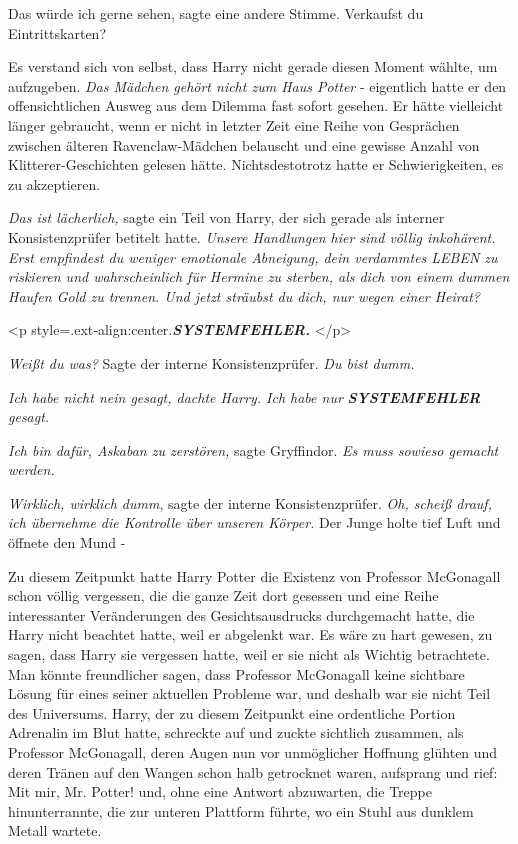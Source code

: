 \glqq Das würde ich gerne sehen\grqq{}, sagte eine andere Stimme. \glqq
Verkaufst du Eintrittskarten?\grqq{}

Es verstand sich von selbst, dass Harry nicht gerade diesen Moment wählte, um
aufzugeben. \emph{Das Mädchen gehört nicht zum Haus Potter }- eigentlich hatte
er den offensichtlichen Ausweg aus dem Dilemma fast sofort gesehen. Er hätte
vielleicht länger gebraucht, wenn er nicht in letzter Zeit eine Reihe von
Gesprächen zwischen älteren Ravenclaw-Mädchen belauscht und eine gewisse Anzahl
von Klitterer-Geschichten gelesen hätte. Nichtsdestotrotz hatte er
Schwierigkeiten, es zu akzeptieren.

\emph{Das ist lächerlich,} sagte ein Teil von Harry, der sich gerade als
interner Konsistenzprüfer betitelt hatte. \emph{Unsere Handlungen hier sind
völlig inkohärent. Erst empfindest du weniger emotionale Abneigung, dein
verdammtes LEBEN zu riskieren und wahrscheinlich für Hermine zu sterben, als
dich von einem dummen Haufen Gold zu trennen. Und jetzt sträubst du dich, nur
wegen einer Heirat?}

<p style=\grqq{}.ext-align:center\grqq{}.\textbf{\emph{SYSTEMFEHLER. }}</p>

\emph{Weißt du was?} Sagte der interne Konsistenzprüfer. \emph{Du bist dumm.}

\emph{Ich habe nicht nein gesagt, dachte Harry. Ich habe nur
}\textbf{\emph{SYSTEMFEHLER}}\emph{ gesagt.}

\emph{Ich bin dafür, Askaban zu zerstören,} sagte Gryffindor. \emph{Es muss
sowieso gemacht werden.}

\emph{Wirklich, wirklich dumm}, sagte der interne Konsistenzprüfer. \emph{Oh,
scheiß drauf, ich übernehme die Kontrolle über unseren Körper. } Der Junge holte
tief Luft und öffnete den Mund -

Zu diesem Zeitpunkt hatte Harry Potter die Existenz von Professor McGonagall
schon völlig vergessen, die die ganze Zeit dort gesessen und eine Reihe
interessanter Veränderungen des Gesichtsausdrucks durchgemacht hatte, die Harry
nicht beachtet hatte, weil er abgelenkt war. Es wäre zu hart gewesen, zu sagen,
dass Harry sie vergessen hatte, weil er sie nicht als Wichtig betrachtete. Man
könnte freundlicher sagen, dass Professor McGonagall keine sichtbare Lösung für
eines seiner aktuellen Probleme war, und deshalb war sie nicht Teil des
Universums. Harry, der zu diesem Zeitpunkt eine ordentliche Portion Adrenalin im
Blut hatte, schreckte auf und zuckte sichtlich zusammen, als Professor
McGonagall, deren Augen nun vor unmöglicher Hoffnung glühten und deren Tränen
auf den Wangen schon halb getrocknet waren, aufsprang und rief: \glqq Mit mir,
Mr. Potter!\grqq{} und, ohne eine Antwort abzuwarten, die Treppe hinunterrannte,
die zur unteren Plattform führte, wo ein Stuhl aus dunklem Metall wartete.

